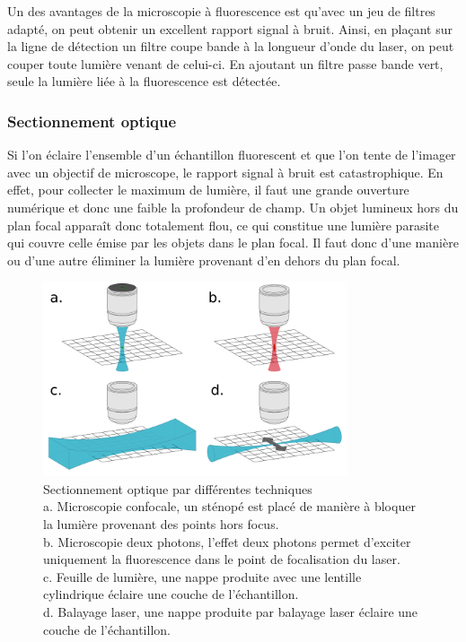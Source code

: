 Un des avantages de la microscopie à fluorescence est qu'avec un jeu de filtres adapté, on peut obtenir un excellent rapport signal à bruit. Ainsi, en plaçant sur la ligne de détection un filtre coupe bande à la longueur d'onde du laser, on peut couper toute lumière venant de celui-ci. En ajoutant un filtre passe bande vert, seule la lumière liée à la fluorescence est détectée.

\subsubsection{Sectionnement optique}

Si l'on éclaire l'ensemble d'un échantillon fluorescent et que l'on tente de l'imager avec un objectif de microscope, le rapport signal à bruit est catastrophique. En effet, pour collecter le maximum de lumière, il faut une grande ouverture numérique et donc une faible la profondeur de champ. Un objet lumineux hors du plan focal apparaît donc totalement flou, ce qui constitue une lumière parasite qui couvre celle émise par les objets dans le plan focal. Il faut donc d'une manière ou d'une autre éliminer la lumière provenant d'en dehors du plan focal.

\begin{figure}
  \centering
  \includegraphics[width=0.8\textwidth]{./files/optical_sectionning.svg.png}
  \caption{Sectionnement optique par différentes techniques \\
  a. Microscopie confocale, un sténopé est placé de manière à bloquer la lumière provenant des points hors focus. \\
  b. Microscopie deux photons, l'effet deux photons permet d'exciter uniquement la fluorescence dans le point de focalisation du laser. \\
  c. Feuille de lumière, une nappe produite avec une lentille cylindrique éclaire une couche de l'échantillon. \\
  d. Balayage laser, une nappe produite par balayage laser éclaire une couche de l'échantillon. \\
  }
  \end{figure}

